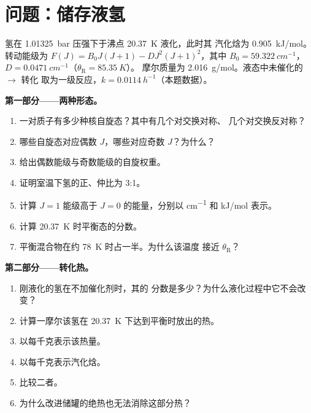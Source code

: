\section{问题：储存液氢}

\begin{problem}
\label{pb:b3:statistical-thermo-applied:1}
氢在 \qty{1.01325}{bar} 压强下于沸点 \qty{20.37}{K} 液化，此时其
汽化焓为 \qty{0.905}{kJ/mol}。转动能级为 $F(J) = B_0J(J+1) -
D J^2(J+1)^2$，其中 $B_0 = \qty{59.322}{cm^{-1}}$，$D = \qty{0.0471}{cm^{-1}}$（$\theta_{\mathrm R} = \qty{85.35}{K}$）。
摩尔质量为 \qty{2.016}{g/mol}。液态中未催化的 $\to$ 转化
取为一级反应，$k = \qty{0.0114}{h^{-1}}$（本题数据）。

\medskip\noindent\textbf{第一部分——两种形态。}
\begin{enumerate}
  \item 一对质子有多少种核自旋态？其中有几个对交换对称、
        几个对交换反对称？
  \item 哪些自旋态对应偶数 $J$，哪些对应奇数 $J$？为什么？
  \item 给出偶数能级与奇数能级的自旋权重。
  \item 证明室温下氢的正、仲比为 3:1。
  \item 计算 $J = 1$ 能级高于 $J = 0$ 的能量，分别以 \unit{cm^{-1}} 和
        \unit{kJ/mol} 表示。
  \item 计算 \qty{20.37}{K} 时平衡态的分数。
  \item 平衡混合物在约 \qty{78}{K} 时占一半。为什么该温度
        接近 $\theta_{\mathrm R}$？
\end{enumerate}

\medskip\noindent\textbf{第二部分——转化热。}
\begin{enumerate}[resume]
  \item 刚液化的氢在不加催化剂时，其的
        分数是多少？为什么液化过程中它不会改变？
  \item 计算一摩尔该氢在
        \qty{20.37}{K} 下达到平衡时放出的热。
  \item 以每千克表示该热量。
  \item 以每千克表示汽化焓。
  \item 比较二者。
  \item 为什么改进储罐的绝热也无法消除这部分热？
\end{enumerate}


\end{problem}
